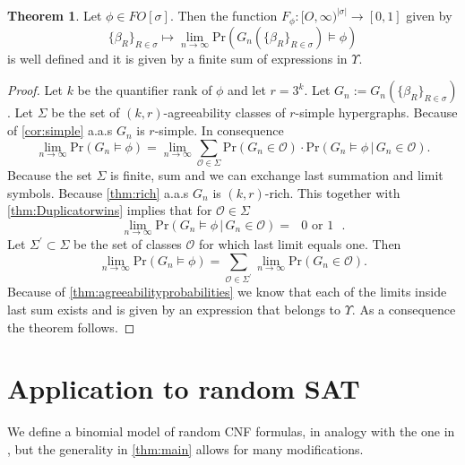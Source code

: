 \documentclass[12pt,notitlepage,a4paper]{article}
\theoremstyle{definition}
\newtheorem{theorem}{Theorem}[section]
\newcommand{\Ln}{\lim\limits_{n\to \infty}}
\begin{document}
\begin{theorem}
	Let $\phi\in FO[\sigma]$. Then the function 
	$F_\phi: [O,\infty)^{|\sigma|}\rightarrow [0,1]$
	given by
	\[
	\{\beta_R\}_{R\in \sigma} \mapsto
	\Ln \mathrm{Pr} \left(
	G_n\left(\{\beta_R\}_{R\in \sigma}\right) \models \phi
	\right)
	\]
	is well defined and it is given by a finite sum of expressions
	in $\Upsilon$.
\end{theorem}
\begin{proof}
	Let $k$ be the quantifier rank of $\phi$ and
	let $r=3^k$. Let 
	$G_n:=G_n\left(\{\beta_R\}_{R\in \sigma}\right)$.
	Let $\Sigma$ be the set of $(k,r)$-agreeability classes of 
	$r$-simple hypergraphs. Because of \cref{cor:simple} a.a.s 
	$G_n$ is $r$-simple. In consequence
	\begin{equation} \label{eq:aux1}
	\Ln \mathrm{Pr} \left(
	G_n \models \phi
	\right)=
	\Ln
	\sum_{\mathcal{O}\in \Sigma} \mathrm{Pr}\left(
	G_n\in \mathcal{O}
	\right) \cdot 
	\mathrm{Pr}\left(
	G_n\models \phi \,
	\Big| \,
	G_n\in \mathcal{O}
	\right).
	\end{equation}
	Because the set $\Sigma$ is finite, sum and we can exchange
	last summation and limit symbols. Because \cref{thm:rich} a.a.s 
	$G_n$ is $(k,r)$-rich. This together with \cref{thm:Duplicatorwins}
	implies that for $\mathcal{O}\in \Sigma$
	\[
	\Ln \mathrm{Pr}\left(
	G_n\models \phi \,
	\Big| \,
	G_n\in \mathcal{O}
	\right) = 
	\text{ $0$ or $1$ }.
	\]
	Let $\Sigma^\prime\subset \Sigma$ be the set of classes 
	$\mathcal{O}$ for which last limit equals one. Then
	\[
	\Ln \mathrm{Pr} \left(
	G_n \models \phi
	\right)=
	\sum_{\mathcal{O}\in \Sigma^\prime}
	\Ln \mathrm{Pr}\left(
	G_n \in \mathcal{O}
	\right).		
	\]
	Because of \cref{thm:agreeabilityprobabilities} we know that
	each of the limits inside last sum exists and is given by
	an expression that belongs to $\Upsilon$. As a consequence the
	theorem follows. 	
\end{proof}

\section{Application to random SAT}

We define a binomial model of random CNF formulas, 
in analogy with the one in \cite{chvatal1992mick},
but the generality
in \cref{thm:main} allows for many modifications. \par
\end{document}
